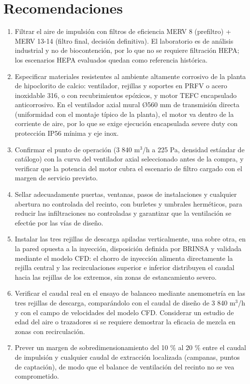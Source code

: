 \section{Recomendaciones}

\begin{enumerate}
	\item Filtrar el aire de impulsión con filtros de eficiencia MERV 8 (prefiltro) + MERV 13-14 (filtro final, decisión definitiva). El laboratorio es de análisis industrial y no de biocontención, por lo que no se requiere filtración HEPA; los escenarios HEPA evaluados quedan como referencia histórica.
	\item Especificar materiales resistentes al ambiente altamente corrosivo de la planta de hipoclorito de calcio: ventilador, rejillas y soportes en PRFV o acero inoxidable 316, o con recubrimientos epóxicos, y motor TEFC encapsulado anticorrosivo. En el ventilador axial mural Ø560 mm de transmisión directa (uniformidad con el montaje típico de la planta), el motor va dentro de la corriente de aire, por lo que se exige ejecución encapsulada severe duty con protección IP56 mínima y eje inox.
	\item Confirmar el punto de operación (3 840 m$^3$/h a 225 Pa, densidad estándar de catálogo) con la curva del ventilador axial seleccionado antes de la compra, y verificar que la potencia del motor cubra el escenario de filtro cargado con el margen de servicio previsto.
	\item Sellar adecuadamente puertas, ventanas, pasos de instalaciones y cualquier abertura no controlada del recinto, con burletes y umbrales herméticos, para reducir las infiltraciones no controladas y garantizar que la ventilación se efectúe por las vías de diseño.
	\item Instalar las tres rejillas de descarga apiladas verticalmente, una sobre otra, en la pared opuesta a la inyección, disposición definida por BRINSA y validada mediante el modelo CFD: el chorro de inyección alimenta directamente la rejilla central y las recirculaciones superior e inferior distribuyen el caudal hacia las rejillas de los extremos, sin zonas de estancamiento severo.
	\item Verificar el caudal real en el ensayo de balanceo mediante anemometría en las tres rejillas de descarga, comparándolo con el caudal de diseño de 3 840 m$^3$/h y con el campo de velocidades del modelo CFD. Considerar un estudio de edad del aire o trazadores si se requiere demostrar la eficacia de mezcla en zonas con recirculación.
	\item Prever un margen de sobredimensionamiento del 10 \% al 20 \% entre el caudal de impulsión y cualquier caudal de extracción localizada (campanas, puntos de captación), de modo que el balance de ventilación del recinto no se vea comprometido.
\end{enumerate}
